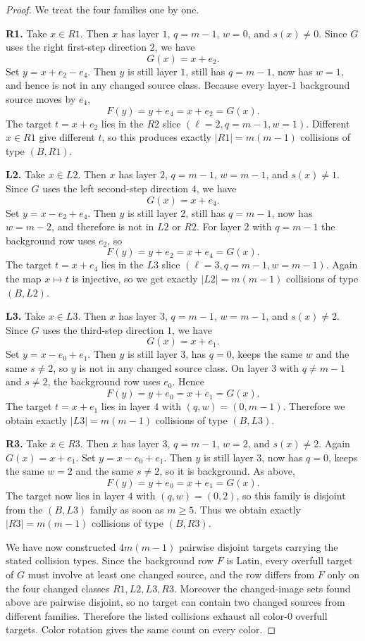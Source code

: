 \documentclass[11pt]{article}
\newcommand{\eX}{e_0}
\newcommand{\eQ}{e_1}
\newcommand{\eW}{e_2}
\newcommand{\eU}{e_4}
\begin{document}
\begin{proof}
We treat the four families one by one.

\smallskip
\noindent\textbf{R1.}
Take $x\in R1$.
Then $x$ has layer $1$, $q=m-1$, $w=0$, and $s(x)\neq 0$.
Since $G$ uses the right first-step direction $2$, we have
\[
G(x)=x+\eW.
\]
Set $y=x+\eW-\eU$.
Then $y$ is still layer $1$, still has $q=m-1$, now has $w=1$, and hence is not in
any changed source class.
Because every layer-$1$ background source moves by $\eU$,
\[
F(y)=y+\eU=x+\eW=G(x).
\]
The target $t=x+\eW$ lies in the $R2$ slice $(\ell=2,q=m-1,w=1)$.
Different $x\in R1$ give different $t$, so this produces exactly $|R1|=m(m-1)$
collisions of type $(B,R1)$.

\smallskip
\noindent\textbf{L2.}
Take $x\in L2$.
Then $x$ has layer $2$, $q=m-1$, $w=m-1$, and $s(x)\neq 1$.
Since $G$ uses the left second-step direction $4$, we have
\[
G(x)=x+\eU.
\]
Set $y=x-\eW+\eU$.
Then $y$ is still layer $2$, still has $q=m-1$, now has $w=m-2$, and therefore is
not in $L2$ or $R2$.
For layer $2$ with $q=m-1$ the background row uses $\eW$, so
\[
F(y)=y+\eW=x+\eU=G(x).
\]
The target $t=x+\eU$ lies in the $L3$ slice $(\ell=3,q=m-1,w=m-1)$.
Again the map $x\mapsto t$ is injective, so we get exactly $|L2|=m(m-1)$
collisions of type $(B,L2)$.

\smallskip
\noindent\textbf{L3.}
Take $x\in L3$.
Then $x$ has layer $3$, $q=m-1$, $w=m-1$, and $s(x)\neq 2$.
Since $G$ uses the third-step direction $1$, we have
\[
G(x)=x+\eQ.
\]
Set $y=x-\eX+\eQ$.
Then $y$ is still layer $3$, has $q=0$, keeps the same $w$ and the same
$s\neq 2$, so $y$ is not in any changed source class.
On layer $3$ with $q\neq m-1$ and $s\neq 2$, the background row uses $\eX$.
Hence
\[
F(y)=y+\eX=x+\eQ=G(x).
\]
The target $t=x+\eQ$ lies in layer $4$ with $(q,w)=(0,m-1)$.
Therefore we obtain exactly $|L3|=m(m-1)$ collisions of type $(B,L3)$.

\smallskip
\noindent\textbf{R3.}
Take $x\in R3$.
Then $x$ has layer $3$, $q=m-1$, $w=2$, and $s(x)\neq 2$.
Again $G(x)=x+\eQ$.
Set $y=x-\eX+\eQ$.
Then $y$ is still layer $3$, now has $q=0$, keeps the same $w=2$ and the same
$s\neq 2$, so it is background.
As above,
\[
F(y)=y+\eX=x+\eQ=G(x).
\]
The target now lies in layer $4$ with $(q,w)=(0,2)$, so this family is disjoint
from the $(B,L3)$ family as soon as $m\ge 5$.
Thus we obtain exactly $|R3|=m(m-1)$ collisions of type $(B,R3)$.

\smallskip
We have now constructed $4m(m-1)$ pairwise disjoint targets carrying the stated
collision types.
Since the background row $F$ is Latin, every overfull target of $G$ must involve
at least one changed source, and the row differs from $F$ only on the four changed
classes $R1,L2,L3,R3$.
Moreover the changed-image sets found above are pairwise disjoint, so no target can
contain two changed sources from different families.
Therefore the listed collisions exhaust all color-$0$ overfull targets.
Color rotation gives the same count on every color.
\end{proof}
\end{document}
